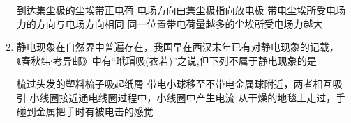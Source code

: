 \begin{enumerate}[leftmargin=0em]
\fourchoices
{到达集尘极的尘埃带正电荷}
{电场方向由集尘极指向放电极}
{带电尘埃所受电场力的方向与电场方向相同}
{同一位置带电荷量越多的尘埃所受电场力越大}



\item
{}
静电现象在自然界中普遍存在，我国早在西汉末年已有对静电现象的记载，《春秋纬∙考异邮》中有“玳瑁吸(衣若)”之说,但下列不属于静电现象的是  


\fourchoices
{梳过头发的塑料梳子吸起纸屑}
{带电小球移至不带电金属球附近，两者相互吸引}
{小线圈接近通电线圈过程中，小线圈中产生电流}
{从干燥的地毯上走过，手碰到金属把手时有被电击的感觉}





\end{enumerate}





